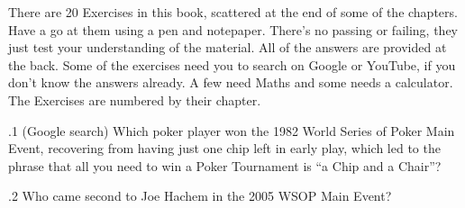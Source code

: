 
There are 20 Exercises in this book, scattered at the end of some of
the chapters. Have a go at them using a pen and notepaper. There's no
passing or failing, they just test your understanding of the
material. All of the answers are provided at the back. Some of the
exercises need you to search on Google or YouTube, if you don't know
the answers already. A few need Maths and some needs a calculator. The
Exercises are numbered by their chapter.

.1 (Google search) Which poker player won the 1982 World
Series of Poker Main Event, recovering from having just one chip
left in early play, which led to the phrase that all you need to win a
Poker Tournament is ``a Chip and a Chair''?

.2 Who came second to Joe Hachem in the 2005 WSOP
Main Event?





